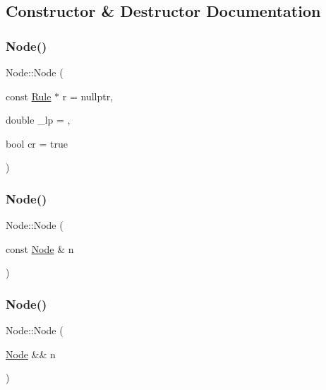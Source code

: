 \subsection{Constructor \& Destructor Documentation}
\mbox{\label{class_node_ae33050869651f64551da2d13ad2a9dbc}} 
\subsubsection{\texorpdfstring{Node()}{Node()}\hspace{0.1cm}{\footnotesize\ttfamily [1/3]}}
{\footnotesize\ttfamily Node\+::\+Node (\begin{DoxyParamCaption}\item[{const \hyperlink{class_rule}{Rule} $\ast$}]{r = {\ttfamily nullptr},  }\item[{double}]{\+\_\+lp = {},  }\item[{bool}]{cr = {\ttfamily true} }\end{DoxyParamCaption})\hspace{0.3cm}{\ttfamily [inline]}}

\mbox{\label{class_node_a277918b68827f6ffd8150f450b0c12c3}} 
\subsubsection{\texorpdfstring{Node()}{Node()}\hspace{0.1cm}{\footnotesize\ttfamily [2/3]}}
{\footnotesize\ttfamily Node\+::\+Node (\begin{DoxyParamCaption}\item[{const \hyperlink{class_node}{Node} \&}]{n }\end{DoxyParamCaption})\hspace{0.3cm}{\ttfamily [inline]}}

\mbox{\label{class_node_a87c9938dcd77c169802a732c98204945}} 
\subsubsection{\texorpdfstring{Node()}{Node()}\hspace{0.1cm}{\footnotesize\ttfamily [3/3]}}
{\footnotesize\ttfamily Node\+::\+Node (\begin{DoxyParamCaption}\item[{\hyperlink{class_node}{Node} \&\&}]{n }\end{DoxyParamCaption})\hspace{0.3cm}{\ttfamily [inline]}}

